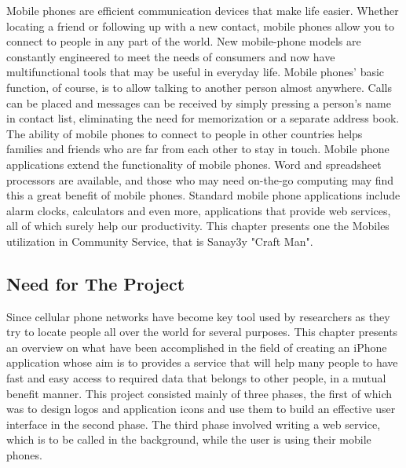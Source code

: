 \documentclass[12pt,a4paper,final,twoside,onecolumn,titlepage]{book}
\begin{document}
Mobile phones are efficient communication devices that make life easier. Whether locating a friend or following up with a new contact, mobile phones allow you to connect to people in any part of the world. New mobile-phone models are constantly engineered to meet the needs of consumers and now have multifunctional tools that may be useful in everyday life. Mobile phones' basic function, of course, is to allow talking to another person almost anywhere. Calls can be placed and messages can be received by simply pressing a person's name in contact list, eliminating the need for memorization or a separate address book. The ability of mobile phones to connect to people in other countries helps families and friends who are far from each other to stay in touch. Mobile phone applications extend the functionality of mobile phones. Word and spreadsheet processors are available, and those who may need on-the-go computing may find this a great benefit of mobile phones. Standard mobile phone applications include alarm clocks, calculators and even more, applications that provide web services,  all of which surely help our productivity. This chapter presents one the Mobiles utilization in Community Service, that is Sanay3y "Craft Man".

\subsection{Need for The Project}
Since cellular phone networks have become key tool used by researchers as they try to locate people all over the world for several purposes. This chapter presents an overview on what have been accomplished in the field of creating an iPhone application whose aim is to provides a service that will help many people to have fast and easy access to required data that belongs to other people, in a mutual benefit manner. This project consisted mainly of three phases, the first of which was to design logos and application icons and use them to build an effective user interface in the second phase. The third phase involved writing a web service, which is to be called in the background, while the user is using their mobile phones. 
\end{document}
